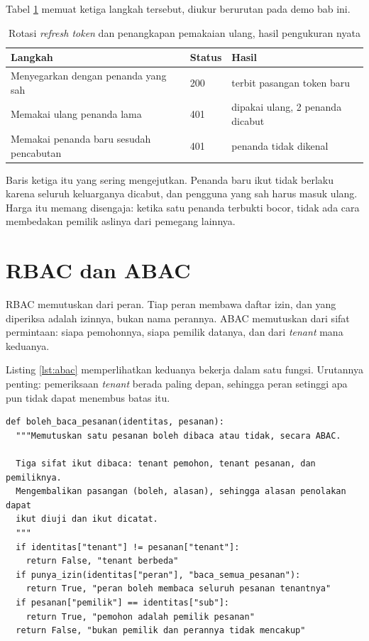 Tabel \ref{tab:rotasi} memuat ketiga langkah tersebut, diukur berurutan pada
demo bab ini.

\begin{table}[!htb]
  \centering
  \caption{Rotasi \textit{refresh token} dan penangkapan pemakaian ulang,
           hasil pengukuran nyata}
  \label{tab:rotasi}
  \begin{tabularx}{\textwidth}{Xll}
    \hline
    \textbf{Langkah} & \textbf{Status} & \textbf{Hasil} \\
    \hline
    Menyegarkan dengan penanda yang sah & 200 & terbit pasangan token baru \\
    \hline
    Memakai ulang penanda lama & 401 & dipakai ulang, 2 penanda dicabut \\
    \hline
    Memakai penanda baru sesudah pencabutan & 401 & penanda tidak dikenal \\
    \hline
  \end{tabularx}
\end{table}

Baris ketiga itu yang sering mengejutkan. Penanda baru ikut tidak berlaku karena
seluruh keluarganya dicabut, dan pengguna yang sah harus masuk ulang. Harga
itu memang disengaja: ketika satu penanda terbukti bocor, tidak ada cara
membedakan pemilik aslinya dari pemegang lainnya.

\section{RBAC dan ABAC}

RBAC memutuskan dari peran. Tiap peran membawa daftar izin, dan yang
diperiksa adalah izinnya, bukan nama perannya. ABAC memutuskan dari sifat
permintaan: siapa pemohonnya, siapa pemilik datanya, dan dari
\textit{tenant} mana keduanya.

Listing \ref{lst:abac} memperlihatkan keduanya bekerja dalam satu fungsi.
Urutannya penting: pemeriksaan \textit{tenant} berada paling depan, sehingga
peran setinggi apa pun tidak dapat menembus batas itu.

\begin{lstlisting}[style=PythonStyle, caption={Tiga sifat diperiksa berurutan, tersedia di \berkas{sources/chapter10/kebijakan.py}}, label={lst:abac}]
def boleh_baca_pesanan(identitas, pesanan):
  """Memutuskan satu pesanan boleh dibaca atau tidak, secara ABAC.

  Tiga sifat ikut dibaca: tenant pemohon, tenant pesanan, dan pemiliknya.
  Mengembalikan pasangan (boleh, alasan), sehingga alasan penolakan dapat
  ikut diuji dan ikut dicatat.
  """
  if identitas["tenant"] != pesanan["tenant"]:
    return False, "tenant berbeda"
  if punya_izin(identitas["peran"], "baca_semua_pesanan"):
    return True, "peran boleh membaca seluruh pesanan tenantnya"
  if pesanan["pemilik"] == identitas["sub"]:
    return True, "pemohon adalah pemilik pesanan"
  return False, "bukan pemilik dan perannya tidak mencakup"
\end{lstlisting}

